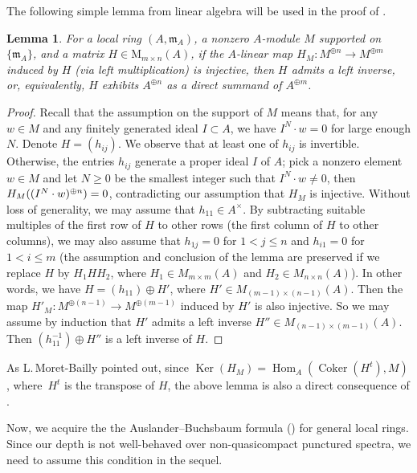\documentclass[JEP,XML,SOM,Unicode,published]{cedram}
\DeclareMathOperator{\Ker}{Ker}
\DeclareMathOperator{\Coker}{Coker}
\DeclareMathOperator{\Hom}{Hom}
\newcommand{\bpf}{\begin{proof}}
\newcommand{\epf}{\end{proof}}
\newcommand{\blemt}{\begin{lemma-tweak}}
\newcommand{\elemt}{\end{lemma-tweak}}
\providecommand{\SP}[1]{\cite[\href{https://stacks.math.columbia.edu/tag/#1}{#1}]{SP}}
\theoremstyle{plain}
\newtheorem{lemma-tweak}[subsection]{Lemma}
\theoremstyle{definition}
\begin{document}
\begin{appendix}
The following simple lemma from linear algebra will be used in the proof of .
\blemt \label{a lem on linear algebra}
For a local ring $(A,\mathfrak{m}_A)$, a nonzero $A$\nobreakdash-mod\-ule $M$ supported on $\{\mathfrak{m}_A\}$, and a matrix $H\in \text{M}_{m\times n}(A)$, if the $A$-linear map $H_M:M^{\oplus n}\to M^{\oplus m}$ induced by $H$ (via left multiplication) is injective, then $H$ admits a left inverse, or, equivalently, $H$ exhibits $A^{\oplus n}$ as a direct summand of $A^{\oplus m}$.
\elemt
\bpf
Recall \SP{0953} that the assumption on the support of $M$ means that, for any $w\in M$ and any finitely generated ideal $I\subset A$, we have $I^N\cdot w=0$ for large enough $N$.
Denote $H=(h_{ij})$.
We observe that at least one of $h_{ij}$ is invertible.
Otherwise, the entries $h_{ij}$ generate a proper ideal $I$ of $A$; pick a nonzero element \hbox{$w\!\in\! M$} and let $N\ge 0$ be the smallest integer such that $I^N\cdot w\neq 0$, then $H_M((I^N\cdot w)^{\oplus n})=\nobreak0$, contradicting our assumption that $H_M$ is injective.
Without loss of generality, we may assume that $h_{11} \in A^{\times}$. By subtracting suitable multiples of the first row of $H$ to other rows (\resp the first column of $H$ to other columns), we may also assume that $h_{1j}=0$ for $1<j\le n$ and $h_{i1}=0$ for $1<i\le m$ (the assumption and conclusion of the lemma are preserved if we replace $H$ by $H_1HH_2$, where $H_1\in M_{m\times m}(A)$ and $H_2\in M_{n\times n}(A)$). In other words, we have $H=(h_{11}) \oplus H'$, where $H'\in M_{(m-1)\times (n-1)}(A)$. Then the map $H'_{M}: M^{\oplus (n-1)}\to M^{\oplus (m-1)}$ induced by $H'$ is also injective. So we may assume by induction that $H'$ admits a left inverse $H''\in M_{(n-1)\times(m-1)}(A)$. Then $(h_{11}^{-1}) \oplus H''$ is a left inverse of $H$.
\epf
{As L.\,Moret-Bailly pointed out, since $\Ker(H_M)=\Hom_A(\Coker(H^{t}), M)$, where~$H^t$ is the transpose of $H$, the above lemma is also a direct consequence of .}

Now, we acquire the the Auslander--Buchsbaum formula (\cf \cite[Th.\,3.7]{AB57}) for general local rings.
{Since our depth is not well-behaved over non-quasicompact punctured spectra, we need to assume this condition in the sequel.}


\end{appendix}
\end{document}

